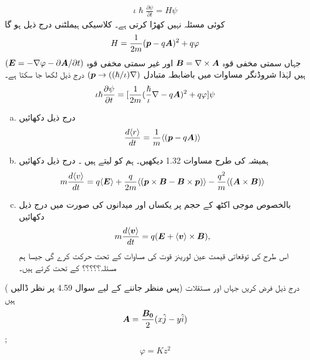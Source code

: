 \begin{align}
    \iota\hslash\frac{\partial\psi}{\partial t}=H\psi
\end{align}
کوئی مسئلہ نہیں کھڑا کرتی ہے۔ کلاسیکی ہیملٹنی درج ذیل ہو گا 
\begin{align}
    H=\frac{1}{2m}({{\boldsymbol{p}}}-q{{\boldsymbol{A}}})^2+q\varphi
\end{align}
 جہاں   سمتی مخفی قوہ \({{\boldsymbol{B}}}=\nabla \times {\ensuremath{{\boldsymbol{A}}}}\) اور  غیر سمتی مخفی قوہ \(({{\boldsymbol{E}}}= -\nabla\varphi-\partial{\ensuremath{{\boldsymbol{A}}}}/\partial t)\) ہیں لہٰذا شروڈنگر مساوات میں باضابطہ متبادل \(({{\boldsymbol{p}}}\rightarrow((\hslash/\iota)\nabla)\) درج ذیل لکھا جا سکتا ہے۔
\begin{align}
    \iota\hslash\frac{\partial\psi}{\partial t}=[\frac{1}{2m}(\frac{\hslash}{\iota}\nabla-q{{\boldsymbol{A}}})^2+q\varphi]\psi
\end{align}
\begin{enumerate}[a.]
\item درج ذیل دکھائیں 
  \begin{align}
    \frac{d\langle r \rangle }{dt}=\frac{1}{m}\langle({{\boldsymbol{p}}}-q{{\boldsymbol{A}}})\rangle
\end{align}
\item ہمیشہ کی طرح مساوات 1.32 دیکھیں۔ ہم   کو  لیتے ہیں ۔ درج ذیل دکھائیں 
\begin{align}
    m\frac{d\langle v \rangle}{dt}=q\langle{\ensuremath{{\boldsymbol{E}}}}\rangle+\frac{q}{2m}\langle({{\boldsymbol{p}}}\times{\ensuremath{{\boldsymbol{B}}}}-{{\boldsymbol{B}}}\times{\ensuremath{{\boldsymbol{p}}}})\rangle-\frac{q^2}{m} \langle ({{\boldsymbol{A}}}\times{\ensuremath{{\boldsymbol{B}}}})\rangle
\end{align}
\item    بالخصوص موجی اکٹھ کے حجم پر یکساں  اور  میدانوں کی صورت میں درج ذیل دکھائیں 
  \begin{align}
    m\frac{d\langle {\ensuremath{{\boldsymbol{v}}}}\rangle}{dt}=q({{\boldsymbol{E}}}+\langle{\ensuremath{{\boldsymbol{v}}}}\rangle\times{\ensuremath{{\boldsymbol{B}}}}),
\end{align}
  اس طرح  کی توقعاتی قیمت عین لورینز قوت کی مساوات کے تحت حرکت کرے گی جیسا ہم مسئلہ؟؟؟؟؟ کے تحت کرتے ہیں۔
\end{enumerate}
( پس منظر جاننے کے لیے سوال 4.59 پر نظر ڈالیں) درج ذیل فرض کریں جہاں  اور   مستقلات ہیں 
\begin{align*}
    {\ensuremath{{\boldsymbol{A}}}}=\frac{{{\boldsymbol{B_0}}}}{2}(x{\hat{j}}-y{\hat{i}})
\end{align*}
;
\begin{align*}
    \varphi=Kz^2
\end{align*} 
